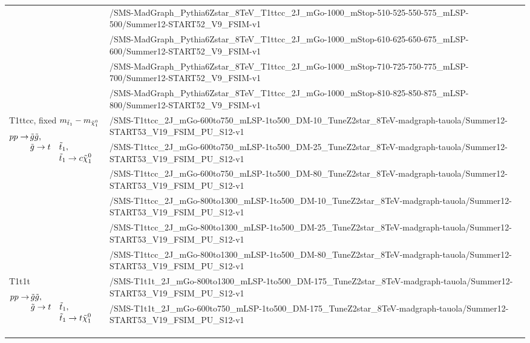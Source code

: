 \begin{sidewaystable}
\begin{center}
\begin{tabular}{l l}
&/SMS-MadGraph\_Pythia6Zstar\_8TeV\_T1ttcc\_2J\_mGo-1000\_mStop-510-525-550-575\_mLSP-500/Summer12-START52\_V9\_FSIM-v1 \\
&/SMS-MadGraph\_Pythia6Zstar\_8TeV\_T1ttcc\_2J\_mGo-1000\_mStop-610-625-650-675\_mLSP-600/Summer12-START52\_V9\_FSIM-v1 \\
&/SMS-MadGraph\_Pythia6Zstar\_8TeV\_T1ttcc\_2J\_mGo-1000\_mStop-710-725-750-775\_mLSP-700/Summer12-START52\_V9\_FSIM-v1 \\
&/SMS-MadGraph\_Pythia6Zstar\_8TeV\_T1ttcc\_2J\_mGo-1000\_mStop-810-825-850-875\_mLSP-800/Summer12-START52\_V9\_FSIM-v1 \\
\midrule
\multirow{6}{3.5cm}{T1ttcc, fixed $m_{\tilde{t}_1} - m_{\tilde{\chi}_1^0}$
\begin{alignat*}{3}
pp \rightarrow\, &\tilde{g} \tilde{g}, \\[-3pt]
                   &\tilde{g} \rightarrow t &&\tilde{t}_1, \\[-3pt]
                   &                        &&\tilde{t}_1 \rightarrow c \tilde{\chi}_1^0
\end{alignat*}}
&/SMS-T1ttcc\_2J\_mGo-600to750\_mLSP-1to500\_DM-10\_TuneZ2star\_8TeV-madgraph-tauola/Summer12-START53\_V19\_FSIM\_PU\_S12-v1 \\
&/SMS-T1ttcc\_2J\_mGo-600to750\_mLSP-1to500\_DM-25\_TuneZ2star\_8TeV-madgraph-tauola/Summer12-START53\_V19\_FSIM\_PU\_S12-v1 \\
&/SMS-T1ttcc\_2J\_mGo-600to750\_mLSP-1to500\_DM-80\_TuneZ2star\_8TeV-madgraph-tauola/Summer12-START53\_V19\_FSIM\_PU\_S12-v1 \\
&/SMS-T1ttcc\_2J\_mGo-800to1300\_mLSP-1to500\_DM-10\_TuneZ2star\_8TeV-madgraph-tauola/Summer12-START53\_V19\_FSIM\_PU\_S12-v1 \\
&/SMS-T1ttcc\_2J\_mGo-800to1300\_mLSP-1to500\_DM-25\_TuneZ2star\_8TeV-madgraph-tauola/Summer12-START53\_V19\_FSIM\_PU\_S12-v1 \\
&/SMS-T1ttcc\_2J\_mGo-800to1300\_mLSP-1to500\_DM-80\_TuneZ2star\_8TeV-madgraph-tauola/Summer12-START53\_V19\_FSIM\_PU\_S12-v1 \\
\midrule
\multirow{4}{3.5cm}{T1t1t
\vspace{-1.5ex}
\begin{alignat*}{3}
pp \rightarrow\, &\tilde{g} \tilde{g}, \\[-3pt]
                   &\tilde{g} \rightarrow t &&\tilde{t}_1, \\[-3pt]
                   &                        &&\tilde{t}_1 \rightarrow t \tilde{\chi}_1^0
\end{alignat*}}
&/SMS-T1t1t\_2J\_mGo-800to1300\_mLSP-1to500\_DM-175\_TuneZ2star\_8TeV-madgraph-tauola/Summer12-START53\_V19\_FSIM\_PU\_S12-v1 \\
&/SMS-T1t1t\_2J\_mGo-600to750\_mLSP-1to500\_DM-175\_TuneZ2star\_8TeV-madgraph-tauola/Summer12-START53\_V19\_FSIM\_PU\_S12-v1 \\
& \\
& \\
& \\
\bottomrule
\end{tabular}
\end{center}
\label{tab:boost_mc_sms}
\end{sidewaystable}

